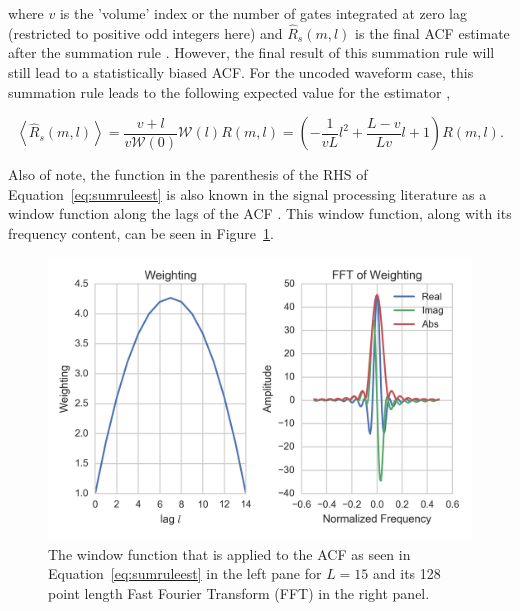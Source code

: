 \documentclass[draft,ras]{agutex}
\begin{document}
\begin{article}
\noindent where $v$ is the 'volume' index or the number of gates integrated at zero lag (restricted to positive odd integers here) and $\widehat{R}_s(m,l)$ is the final ACF estimate after the summation rule \citep{nygren1996}. 
However, the final result of this summation rule will still lead to a statistically biased ACF. For the uncoded waveform case, this summation rule leads to the following expected value for the estimator \citep{nygren1996},

\begin{equation}
\label{eq:sumruleest}
\left\langle\widehat{R}_s(m,l) \right\rangle  =\frac{v+l}{v\mathcal{W}(0)}\mathcal{W}(l)R(m,l) =\left(-\frac{1}{vL}l^2+\frac{L-v}{Lv}l+1\right)   R(m,l).
\end{equation}

\noindent Also of note, the function in the parenthesis of the RHS of Equation~\ref{eq:sumruleest} is also known in the signal processing literature as a window function along the lags of the ACF \citep{dtsp:openhiem}. This window function, along with its frequency content, can be seen in Figure~\ref{fig:isrwindow}.

\begin{figure}[!t]
\centering
\includegraphics[width=5in]{ISRWindow}
\caption{The window function that is applied to the ACF as seen in Equation~\ref{eq:sumruleest} in the left pane for $L=15$ and its 128 point length Fast Fourier Transform (FFT) in the right panel. }
\label{fig:isrwindow}
\end{figure}



\end{article}
\end{document}
